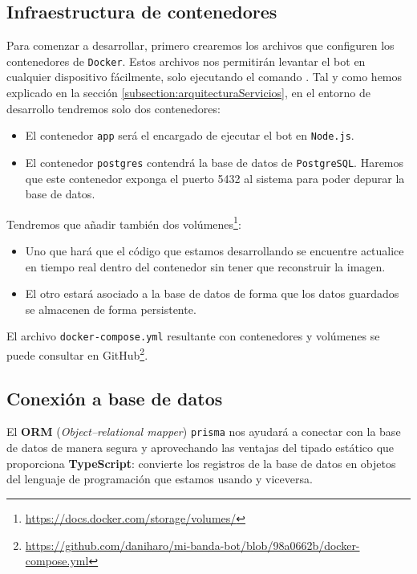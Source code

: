 \subsection{Infraestructura de contenedores}

Para comenzar a desarrollar, primero crearemos los archivos que configuren los contenedores de \texttt{Docker}. Estos archivos nos permitirán levantar el bot en cualquier dispositivo fácilmente, solo ejecutando el comando . Tal y como hemos explicado en la sección \ref{subsection:arquitecturaServicios}, en el entorno de desarrollo tendremos solo dos contenedores:

\begin{itemize}
    \item El contenedor \texttt{app} será el encargado de ejecutar el bot en \texttt{Node.js}. 
    \item El contenedor \texttt{postgres} contendrá la base de datos de \texttt{PostgreSQL}. Haremos que este contenedor exponga el puerto 5432 al sistema para poder depurar la base de datos.
\end{itemize}

Tendremos que añadir también dos volúmenes\footnote{\url{https://docs.docker.com/storage/volumes/}}:

\begin{itemize}
    \item Uno que hará que el código que estamos desarrollando se encuentre actualice en tiempo real dentro del contenedor sin tener que reconstruir la imagen.
    \item El otro estará asociado a la base de datos de forma que los datos guardados se almacenen de forma persistente.
\end{itemize}

El archivo \texttt{docker-compose.yml} resultante con contenedores y volúmenes se puede consultar en GitHub\footnote{\url{https://github.com/daniharo/mi-banda-bot/blob/98a0662b/docker-compose.yml}}.

\subsection{Conexión a base de datos}

El \textbf{ORM} (\textit{Object--relational mapper}) \texttt{prisma} nos ayudará a conectar con la base de datos de manera segura y aprovechando las ventajas del tipado estático que proporciona \textbf{TypeScript}: convierte los registros de la base de datos en objetos del lenguaje de programación que estamos usando y viceversa.

